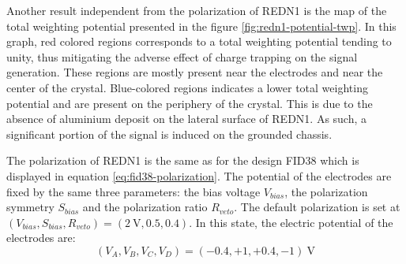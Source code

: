 Another result independent from the polarization of REDN1 is the map of the total weighting potential presented in the figure \ref{fig:redn1-potential-twp}.
In this graph, red colored regions corresponds to a total weighting potential tending to unity, thus mitigating the adverse effect of charge trapping on the signal generation. These regions are mostly present near the electrodes and near the center of the crystal. 
Blue-colored regions indicates a lower total weighting potential and are present on the periphery of the crystal. This is due to the absence of aluminium deposit on the lateral surface of REDN1. As such, a significant portion of the signal is induced on the grounded chassis.

The polarization of REDN1 is the same as for the design FID38 which is displayed in equation \ref{eq:fid38-polarization}. The potential of the electrodes are fixed by the same three parameters: the bias voltage $V_{bias}$, the polarization symmetry $S_{bias}$ and the polarization ratio $R_{veto}$.
The default polarization is set at $\left( V_{bias}, S_{bias}, R_{veto} \right) = (\SI{2}{\volt}, 0.5, 0.4)$. In this state, the electric potential of the electrodes are:
\begin{equation}
\label{eq:redn1-default-polarization}
(V_A, V_B, V_C, V_D) = (-0.4, +1, +0.4, -1)\ \si{\volt}
\end{equation}

